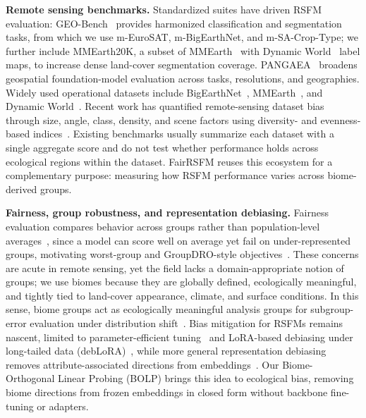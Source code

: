 \documentclass[10pt,twocolumn,letterpaper]{article}
\newcommand{\method}{FairRSFM\xspace}
\begin{document}
\smallskip
\noindent\textbf{Remote sensing benchmarks.} Standardized suites have driven RSFM evaluation: GEO-Bench~\cite{geobench} provides harmonized classification and segmentation tasks, from which we use m-EuroSAT, m-BigEarthNet, and m-SA-Crop-Type; we further include MMEarth20K, a subset of MMEarth~\cite{mmearth} with Dynamic World~\cite{dynamicworld} label maps, to increase dense land-cover segmentation coverage. PANGAEA~\cite{pangaea} broadens geospatial foundation-model evaluation across tasks, resolutions, and geographies. Widely used operational datasets include BigEarthNet~\cite{bigearthnet,bigearthnetmm}, MMEarth~\cite{mmearth}, and Dynamic World~\cite{dynamicworld}. Recent work has quantified remote-sensing dataset bias through size, angle, class, density, and scene factors using diversity- and evenness-based indices~\cite{rsd_biaseval}. Existing benchmarks usually summarize each dataset with a single aggregate score and do not test whether performance holds across ecological regions within the dataset. \method reuses this ecosystem for a complementary purpose: measuring how RSFM performance varies across biome-derived groups.

\smallskip
\noindent\textbf{Fairness, group robustness, and representation debiasing.} Fairness evaluation compares behavior across groups rather than population-level averages~\cite{fairnesssurvey}, since a model can score well on average yet fail on under-represented groups, motivating worst-group and GroupDRO-style objectives~\cite{groupdro,wilds}. These concerns are acute in remote sensing, yet the field lacks a domain-appropriate notion of groups; we use biomes because they are globally defined, ecologically meaningful, and tightly tied to land-cover appearance, climate, and surface conditions. In this sense, biome groups act as ecologically meaningful analysis groups for subgroup-error evaluation under distribution shift~\cite{hardt2016equality,woodworth2017learning,shao2024fairnessshift}. Bias mitigation for RSFMs remains nascent, limited to parameter-efficient tuning~\cite{yin2025remote} and LoRA-based debiasing under long-tailed data (debLoRA)~\cite{deblora}, while more general representation debiasing removes attribute-associated directions from embeddings~\cite{bolukbasi2016man,ravfogel2020null}. Our Biome-Orthogonal Linear Probing (BOLP) brings this idea to ecological bias, removing biome directions from frozen embeddings in closed form without backbone fine-tuning or adapters.
\end{document}
